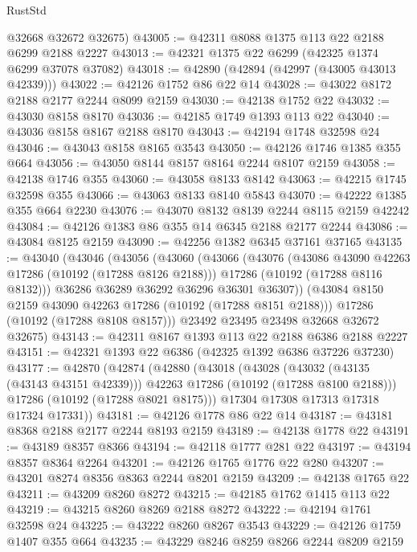 \begin{lexlean}{RustStd}
\begin{coremodule}
      @32668
      @32672
      @32675)
@43005 := @42311 @8088 @1375 @113 @22 @2188 @6299 @2188 @2227
@43013 := @42321 @1375 @22 @6299 (@42325 @1374 @6299 @37078 @37082)
@43018 := @42890 (@42894 (@42997 (@43005 @43013 @42339)))
@43022 := @42126 @1752 @86 @22 @14
@43028 := @43022 @8172 @2188 @2177 @2244 @8099 @2159
@43030 := @42138 @1752 @22
@43032 := @43030 @8158 @8170
@43036 := @42185 @1749 @1393 @113 @22
@43040 := @43036 @8158 @8167 @2188 @8170
@43043 := @42194 @1748 @32598 @24
@43046 := @43043 @8158 @8165 @3543
@43050 := @42126 @1746 @1385 @355 @664
@43056 := @43050 @8144 @8157 @8164 @2244 @8107 @2159
@43058 := @42138 @1746 @355
@43060 := @43058 @8133 @8142
@43063 := @42215 @1745 @32598 @355
@43066 := @43063 @8133 @8140 @5843
@43070 := @42222 @1385 @355 @664 @2230
@43076 := @43070 @8132 @8139 @2244 @8115 @2159 @42242
@43084 := @42126 @1383 @86 @355 @14 @6345 @2188 @2177 @2244
@43086 := @43084 @8125 @2159
@43090 := @42256 @1382 @6345 @37161 @37165
@43135 := @43040
    (@43046
      (@43056
        (@43060
          (@43066
            (@43076
              (@43086 @43090 @42263 @17286 (@10192 (@17288 @8126 @2188)))
              @17286
              (@10192 (@17288 @8116 @8132)))
            @36286
            @36289
            @36292
            @36296
            @36301
            @36307))
        (@43084 @8150 @2159 @43090 @42263 @17286 (@10192 (@17288 @8151 @2188)))
        @17286
        (@10192 (@17288 @8108 @8157)))
      @23492
      @23495
      @23498
      @32668
      @32672
      @32675)
@43143 := @42311 @8167 @1393 @113 @22 @2188 @6386 @2188 @2227
@43151 := @42321 @1393 @22 @6386 (@42325 @1392 @6386 @37226 @37230)
@43177 := @42870
    (@42874
      (@42880
        (@43018
          (@43028
            (@43032 (@43135 (@43143 @43151 @42339)))
            @42263
            @17286
            (@10192 (@17288 @8100 @2188)))
          @17286
          (@10192 (@17288 @8021 @8175)))
        @17304
        @17308
        @17313
        @17318
        @17324
        @17331))
@43181 := @42126 @1778 @86 @22 @14
@43187 := @43181 @8368 @2188 @2177 @2244 @8193 @2159
@43189 := @42138 @1778 @22
@43191 := @43189 @8357 @8366
@43194 := @42118 @1777 @281 @22
@43197 := @43194 @8357 @8364 @2264
@43201 := @42126 @1765 @1776 @22 @280
@43207 := @43201 @8274 @8356 @8363 @2244 @8201 @2159
@43209 := @42138 @1765 @22
@43211 := @43209 @8260 @8272
@43215 := @42185 @1762 @1415 @113 @22
@43219 := @43215 @8260 @8269 @2188 @8272
@43222 := @42194 @1761 @32598 @24
@43225 := @43222 @8260 @8267 @3543
@43229 := @42126 @1759 @1407 @355 @664
@43235 := @43229 @8246 @8259 @8266 @2244 @8209 @2159

\end{coremodule}
\end{lexlean}
